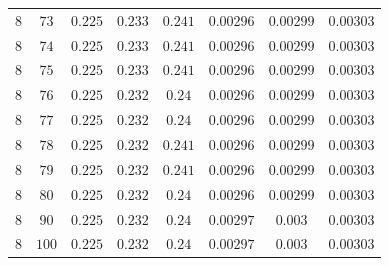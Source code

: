 \begin{table}[H]
\begin{tabular}{cccccccc}
$8$ & $73$ & $0.225$ & $0.233$ & $0.241$ & $0.00296$ & $0.00299$ & $0.00303$\\
$8$ & $74$ & $0.225$ & $0.233$ & $0.241$ & $0.00296$ & $0.00299$ & $0.00303$\\
$8$ & $75$ & $0.225$ & $0.233$ & $0.241$ & $0.00296$ & $0.00299$ & $0.00303$\\
$8$ & $76$ & $0.225$ & $0.232$ & $0.24$ & $0.00296$ & $0.00299$ & $0.00303$\\
$8$ & $77$ & $0.225$ & $0.232$ & $0.24$ & $0.00296$ & $0.00299$ & $0.00303$\\
$8$ & $78$ & $0.225$ & $0.232$ & $0.241$ & $0.00296$ & $0.00299$ & $0.00303$\\
$8$ & $79$ & $0.225$ & $0.232$ & $0.241$ & $0.00296$ & $0.00299$ & $0.00303$\\
$8$ & $80$ & $0.225$ & $0.232$ & $0.24$ & $0.00296$ & $0.00299$ & $0.00303$\\
$8$ & $90$ & $0.225$ & $0.232$ & $0.24$ & $0.00297$ & $0.003$ & $0.00303$\\
$8$ & $100$ & $0.225$ & $0.232$ & $0.24$ & $0.00297$ & $0.003$ & $0.00303$\\
\end{tabular}
\end{table}
 
